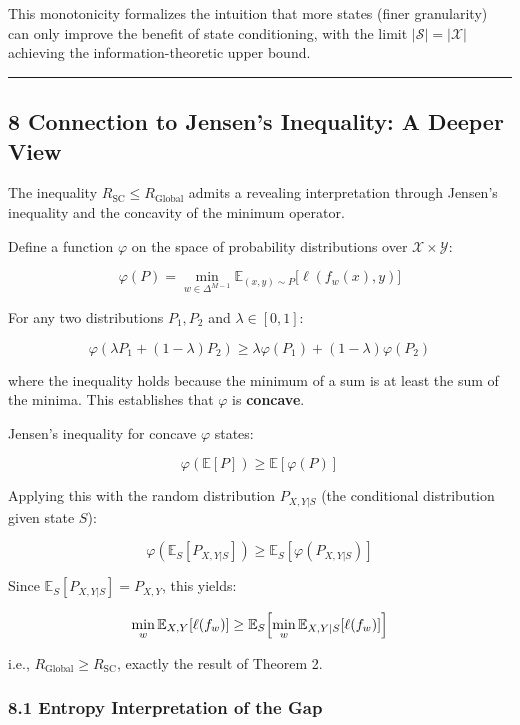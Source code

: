 \documentclass[
  12pt,
]{article}
\begin{document}
This monotonicity formalizes the intuition that more states (finer
granularity) can only improve the benefit of state conditioning, with
the limit \(|\mathcal{S}| = |\mathcal{X}|\) achieving the
information-theoretic upper bound.

\begin{center}\rule{0.5\linewidth}{0.5pt}\end{center}

\subsection{8 Connection to Jensen's Inequality: A Deeper
View}\label{connection-to-jensens-inequality-a-deeper-view}

The inequality \(R_{\text{SC}} \leq R_{\text{Global}}\) admits a
revealing interpretation through Jensen's inequality and the concavity
of the minimum operator.

Define a function \(\varphi\) on the space of probability distributions
over \(\mathcal{X} \times \mathcal{Y}\):

\[\varphi(P) = \min_{w \in \Delta^{M-1}} \mathbb{E}_{(x,y) \sim P}\bigl[\ell(f_w(x), y)\bigr]\]

For any two distributions \(P_1, P_2\) and \(\lambda \in [0,1]\):

\[\varphi(\lambda P_1 + (1-\lambda) P_2) \geq \lambda \varphi(P_1) + (1-\lambda) \varphi(P_2)\]

where the inequality holds because the minimum of a sum is at least the
sum of the minima. This establishes that \(\varphi\) is \textbf{concave}.

Jensen's inequality for concave \(\varphi\) states:

\[\varphi(\mathbb{E}[P]) \geq \mathbb{E}[\varphi(P)]\]

Applying this with the random distribution \(P_{X,Y|S}\) (the
conditional distribution given state \(S\)):

\[\varphi(\mathbb{E}_S[P_{X,Y|S}]) \geq \mathbb{E}_S[\varphi(P_{X,Y|S})]\]

Since \(\mathbb{E}_S[P_{X,Y|S}] = P_{X,Y}\), this yields:

\[\min_w \mathbb{E}_{X,Y}[\ell(f_w)] \geq \mathbb{E}_S\Bigl[\min_w \mathbb{E}_{X,Y|S}[\ell(f_w)]\Bigr]\]

i.e., \(R_{\text{Global}} \geq R_{\text{SC}}\), exactly the result of
Theorem 2.

\subsubsection{8.1 Entropy Interpretation of the
Gap}\label{entropy-interpretation-of-the-gap}
\end{document}
